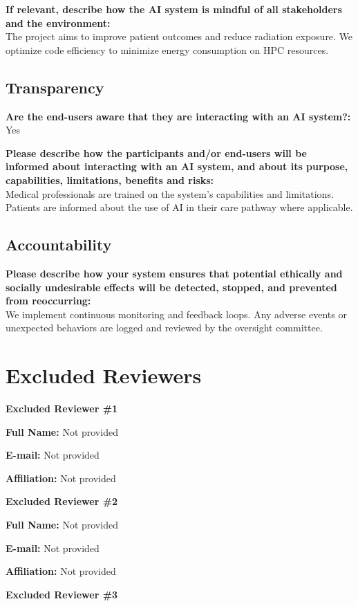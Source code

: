 \documentclass[12pt,a4paper]{article}
\begin{document}
\textbf{If relevant, describe how the AI system is mindful of all stakeholders and the environment:} \\
The project aims to improve patient outcomes and reduce radiation exposure. We optimize code efficiency to minimize energy consumption on HPC resources.

\subsection*{Transparency}

\textbf{Are the end-users aware that they are interacting with an AI system?:} Yes

\textbf{Please describe how the participants and/or end-users will be informed about interacting with an AI system, and about its purpose, capabilities, limitations, benefits and risks:} \\
Medical professionals are trained on the system's capabilities and limitations. Patients are informed about the use of AI in their care pathway where applicable.

\subsection*{Accountability}

\textbf{Please describe how your system ensures that potential ethically and socially undesirable effects will be detected, stopped, and prevented from reoccurring:} \\
We implement continuous monitoring and feedback loops. Any adverse events or unexpected behaviors are logged and reviewed by the oversight committee.

\section*{Excluded Reviewers}

\textbf{Excluded Reviewer \#1}

\textbf{Full Name:} Not provided

\textbf{E-mail:} Not provided

\textbf{Affiliation:} Not provided

\textbf{Excluded Reviewer \#2}

\textbf{Full Name:} Not provided

\textbf{E-mail:} Not provided

\textbf{Affiliation:} Not provided

\textbf{Excluded Reviewer \#3}
\end{document}
